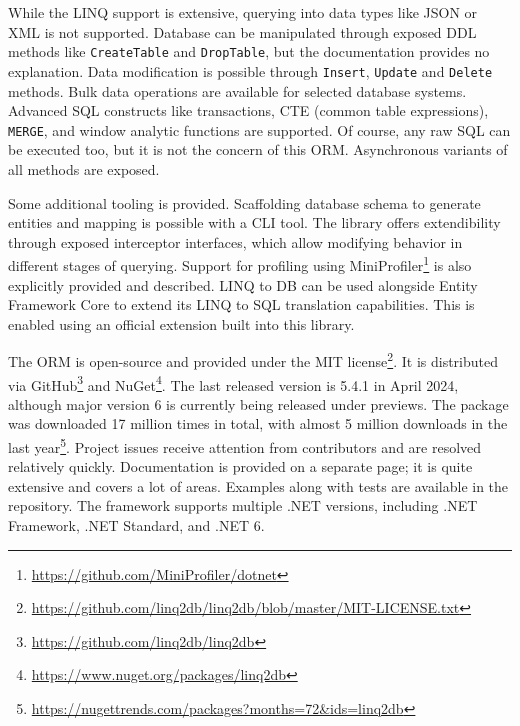 While the LINQ support is extensive, querying into data types like JSON or XML is not supported. 
Database can be manipulated through exposed DDL methods like \texttt{CreateTable} and \texttt{DropTable}, but the documentation provides no explanation. Data modification is possible through \texttt{Insert}, \texttt{Update} and \texttt{Delete} methods. Bulk data operations are available for selected database systems.
Advanced SQL constructs like transactions, CTE (common table expressions), \texttt{MERGE}, and window analytic functions are supported. Of course, any raw SQL can be executed too, but it is not the concern of this ORM. Asynchronous variants of all methods are exposed.

Some additional tooling is provided. Scaffolding database schema to generate entities and mapping is possible with a CLI tool. The library offers extendibility through exposed interceptor interfaces, which allow modifying behavior in different stages of querying. Support for profiling using MiniProfiler\footnote{\url{https://github.com/MiniProfiler/dotnet}} is also explicitly provided and described.
LINQ to DB can be used alongside Entity Framework Core to extend its LINQ to SQL translation capabilities. This is enabled using an official extension built into this library.

The ORM is open-source and provided under the MIT license\footnote{\url{https://github.com/linq2db/linq2db/blob/master/MIT-LICENSE.txt}}. It is distributed via GitHub\footnote{\url{https://github.com/linq2db/linq2db}} and NuGet\footnote{\url{https://www.nuget.org/packages/linq2db}}. The last released version is 5.4.1 in April 2024, although major version 6 is currently being released under previews. The package was downloaded 17 million times in total, with almost 5 million downloads in the last year\footnote{\url{https://nugettrends.com/packages?months=72&ids=linq2db}}. Project issues receive attention from contributors and are resolved relatively quickly. Documentation is provided on a separate page; it is quite extensive and covers a lot of areas. Examples along with tests are available in the repository. The framework supports multiple .NET versions, including .NET Framework, .NET Standard, and .NET 6.

